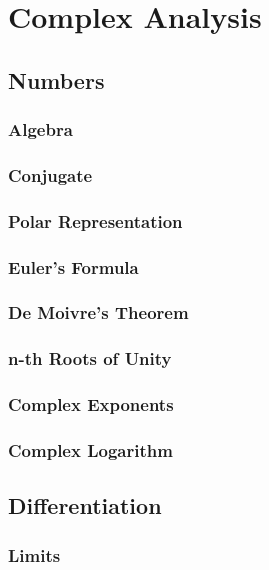 \chapter{Complex Analysis}

\section{Numbers}

\subsection{Algebra}

\subsection{Conjugate}

\subsection{Polar Representation}

\subsection{Euler's Formula}

\subsection{De Moivre's Theorem}

\subsection{n-th Roots of Unity}

\subsection{Complex Exponents}

\subsection{Complex Logarithm}

\newpage
\section{Differentiation}

\subsection{Limits}

